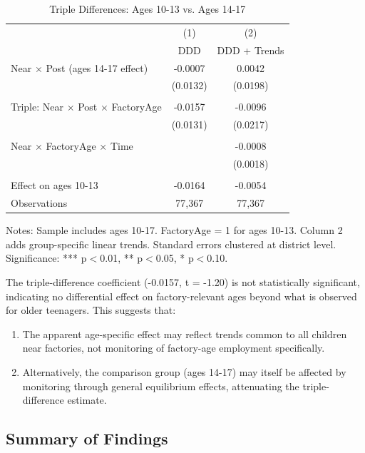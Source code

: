 \begin{table}[H]
\centering
\caption{Triple Differences: Ages 10-13 vs. Ages 14-17}
\label{tab:triple_diff}
\begin{threeparttable}
\begin{tabular}{lcc}
\toprule
& (1) & (2) \\
& DDD & DDD + Trends \\
\midrule
Near $\times$ Post (ages 14-17 effect) & -0.0007 & 0.0042 \\
& (0.0132) & (0.0198) \\
\\
Triple: Near $\times$ Post $\times$ FactoryAge & -0.0157 & -0.0096 \\
& (0.0131) & (0.0217) \\
\\
Near $\times$ FactoryAge $\times$ Time & & -0.0008 \\
& & (0.0018) \\
\\
\midrule
Effect on ages 10-13 & -0.0164 & -0.0054 \\
Observations & 77,367 & 77,367 \\
\bottomrule
\end{tabular}
\begin{tablenotes}
\footnotesize
\item Notes: Sample includes ages 10-17. FactoryAge = 1 for ages 10-13. Column 2 adds group-specific linear trends. Standard errors clustered at district level. Significance: *** p$<$0.01, ** p$<$0.05, * p$<$0.10.
\end{tablenotes}
\end{threeparttable}
\end{table}

The triple-difference coefficient (-0.0157, t = -1.20) is not statistically significant, indicating no differential effect on factory-relevant ages beyond what is observed for older teenagers. This suggests that:
\begin{enumerate}
\item The apparent age-specific effect may reflect trends common to all children near factories, not monitoring of factory-age employment specifically.
\item Alternatively, the comparison group (ages 14-17) may itself be affected by monitoring through general equilibrium effects, attenuating the triple-difference estimate.
\end{enumerate}

\subsection{Summary of Findings}

